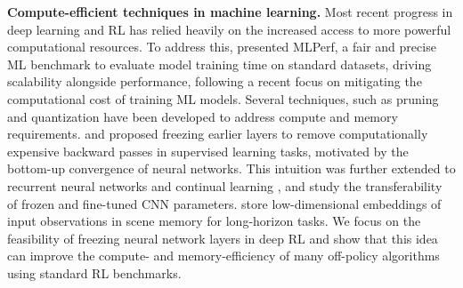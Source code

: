 \documentclass{article}
\begin{document}
{\bf Compute-efficient techniques in machine learning.} 
Most recent progress in deep learning and RL has relied heavily on the increased access to more powerful computational resources. To address this, \citet{mattson2019mlperf} presented MLPerf, a fair and precise ML benchmark to evaluate model training time on standard datasets, driving scalability alongside performance, following a recent focus on mitigating the computational cost of training ML models.
Several techniques, such as pruning and quantization \citep{han2015deep,frankle2018lottery,blalock2020state,iandola2016squeezenet,tay2019lightweight} have been developed to address compute and memory requirements. \citet{46337} and \citet{brock2017freezeout} proposed freezing earlier layers to remove computationally expensive backward passes in supervised learning tasks, motivated by the bottom-up convergence of neural networks. This intuition was further extended to recurrent neural networks \citep{morcos2018insights} and continual learning \citep{pellegrini2019latent}, and \citet{yosinski2014transferable} study the transferability of frozen and fine-tuned CNN parameters. \citet{fang2019scene} store low-dimensional embeddings of input observations in scene memory for long-horizon tasks. We focus on the feasibility of freezing neural network layers in deep RL and show that this idea can improve the compute- and memory-efficiency of many off-policy algorithms using standard RL benchmarks.

\begin{figure*} [t] \centering
{} 
\caption{Illustration of our framework.
(a) Before the encoder is frozen,
all forward and backward passes are active through the network, and we store images in the replay buffer.
(b) After freezing,
we store latent vectors in the replay buffer, 
and remove all forward and backward passes through the encoder. We remark that more samples can be stored in the replay buffer due to the relatively low dimensionality of the latent vector.} \label{fig:main_figure}
\end{figure*}
\end{document}
